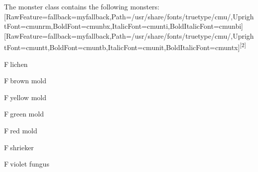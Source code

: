 The monster class contains the following monsters\footnotemark[4]:\allowbreak{}\setmainfont{cmunrm.ttf}[RawFeature={fallback=myfallback},Path=/usr/share/fonts/truetype/cmu/,UprightFont=cmunrm,BoldFont=cmunbx,ItalicFont=cmunti,BoldItalicFont=cmunbi]\setmonofont{cmunrm.ttf}[RawFeature={fallback=myfallback},Path=/usr/share/fonts/truetype/cmu/,UprightFont=cmuntt,BoldFont=cmuntb,ItalicFont=cmunit,BoldItalicFont=cmuntx]\textsuperscript{{$\text{[}$}2{$\text{]}$}}




\begin{myitemize}\item{}F{\mbox{$~$}}lichen\footnotemark[5]
\item{}F{\mbox{$~$}}brown mold\footnotemark[6]
\item{}F{\mbox{$~$}}yellow mold\footnotemark[7]
\item{}F{\mbox{$~$}}green mold\footnotemark[8]
\item{}F{\mbox{$~$}}red mold\footnotemark[9]
\item{}F{\mbox{$~$}}shrieker\footnotemark[10]
\item{}F{\mbox{$~$}}violet fungus\footnotemark[11]
\end{myitemize}

